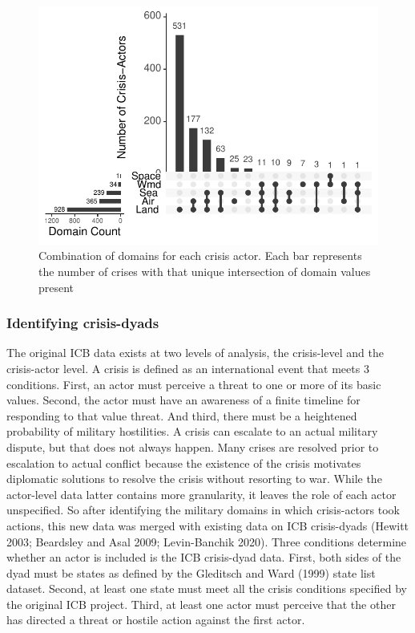 \documentclass[
]{article}
\begin{document}
\begin{figure}[h!]

{\centering \includegraphics{2021-03-26_ICB-Domains_files/figure-latex/domain-combos-1} 

}

\caption{Combination of domains for each crisis actor. Each bar represents the number of crises with that unique intersection of domain values present}\label{fig:domain-combos}
\end{figure}

\hypertarget{identifying-crisis-dyads}{%
\subsubsection{Identifying crisis-dyads}\label{identifying-crisis-dyads}}

The original ICB data exists at two levels of analysis, the crisis-level and the crisis-actor level. A crisis is defined as an international event that meets 3 conditions. First, an actor must perceive a threat to one or more of its basic values. Second, the actor must have an awareness of a finite timeline for responding to that value threat. And third, there must be a heightened probability of military hostilities. A crisis can escalate to an actual military dispute, but that does not always happen. Many crises are resolved prior to escalation to actual conflict because the existence of the crisis motivates diplomatic solutions to resolve the crisis without resorting to war. While the actor-level data latter contains more granularity, it leaves the role of each actor unspecified. So after identifying the military domains in which crisis-actors took actions, this new data was merged with existing data on ICB crisis-dyads (Hewitt 2003; Beardsley and Asal 2009; Levin-Banchik 2020). Three conditions determine whether an actor is included is the ICB crisis-dyad data. First, both sides of the dyad must be states as defined by the Gleditsch and Ward (1999) state list dataset. Second, at least one state must meet all the crisis conditions specified by the original ICB project. Third, at least one actor must perceive that the other has directed a threat or hostile action against the first actor.
\end{document}
